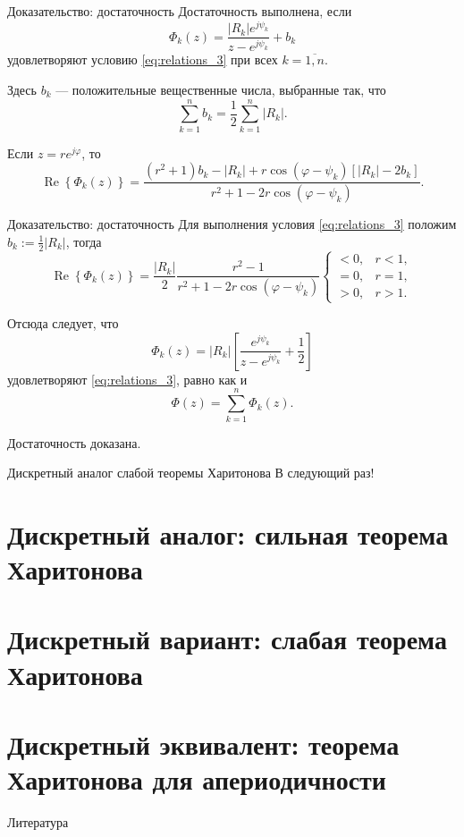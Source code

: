 \documentclass[notheorems,aspectratio=169]{beamer}
\theoremstyle{definition}
\newcommand{\abs}[1]{\left| #1 \right|}
\renewcommand{\Re}{\operatorname{Re}}
\begin{document}
\begin{frame}{Доказательство: достаточность}
  Достаточность выполнена, если
  \begin{equation}
    \Phi_k(z) = \frac{\abs{R_k} e^{j\psi_k}}{z - e^{j\psi_k}} + b_k
  \end{equation}
  удовлетворяют условию \eqref{eq:relations_3} при всех $k=\overline{1,n}$.

  Здесь $b_k$ --- положительные вещественные числа, выбранные так, что
  \begin{equation*}
    \sum_{k=1}^n b_k = \frac{1}{2}\sum_{k=1}^n \abs{R_k}.
  \end{equation*}

  Если $z = re^{j\varphi}$, то
  \begin{equation*}
    \Re \left\{ \Phi_k(z) \right\} = \frac
        {(r^2 + 1)b_k - \abs{R_k} + r \cos(\varphi - \psi_k) \left[ \abs{R_k} -2 b_k \right]}
        {r^2 + 1 - 2r \cos(\varphi - \psi_k)}.
  \end{equation*}
\end{frame}

\begin{frame}{Доказательство: достаточность}
  Для выполнения условия \eqref{eq:relations_3} положим $b_k := \frac{1}{2}\abs{R_k}$, тогда
  \begin{equation*}
    \Re \left\{ \Phi_k(z) \right\} = \frac{\abs{R_k}}{2} \frac{r^2 - 1}{r^2 + 1 - 2r \cos(\varphi - \psi_k)}
    \begin{cases}
      < 0, & r < 1, \\
      = 0, & r = 1, \\
      > 0, & r > 1.
    \end{cases}
  \end{equation*}

  Отсюда следует, что 
  \begin{equation*}
    \Phi_k(z) = \abs{R_k} \left[ \frac{e^{j\psi_k}}{z - e^{j\psi_k}} + \frac{1}{2} \right]
  \end{equation*}
  удовлетворяют \eqref{eq:relations_3}, равно как и
  \begin{equation*}
    \Phi(z) = \sum_{k=1}^n \Phi_k(z).
  \end{equation*}

  Достаточность доказана.
\end{frame}

\begin{frame}{Дискретный аналог слабой теоремы Харитонова}
  В следующий раз!
\end{frame}

\section{Дискретный аналог: сильная теорема Харитонова}
\section{Дискретный вариант: слабая теорема Харитонова}
\section{Дискретный эквивалент: теорема Харитонова для апериодичности}

\begin{frame}[shrink=25]{Литература}
  \nocite{Jury1990Ru}
  \printbibliography
\end{frame}
\end{document}
